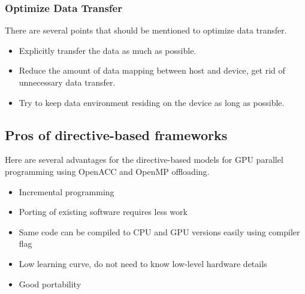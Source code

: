 





\subsubsection{Optimize Data Transfer}


\par
There are several points that should be mentioned to optimize data transfer.
\begin{itemize}
    \item Explicitly transfer the data as much as possible.
    \item Reduce the amount of data mapping between host and device, get rid of unnecessary data transfer.
    \item Try to keep data environment residing on the device as long as possible.
\end{itemize}




\subsection{Pros of directive-based frameworks}


\par
Here are several advantages for the directive-based models for GPU parallel programming using OpenACC and OpenMP offloading.
\begin{itemize}
    \item Incremental programming
    \item Porting of existing software requires less work
    \item Same code can be compiled to CPU and GPU versions easily using compiler flag
    \item Low learning curve, do not need to know low-level hardware details
    \item Good portability
\end{itemize}


